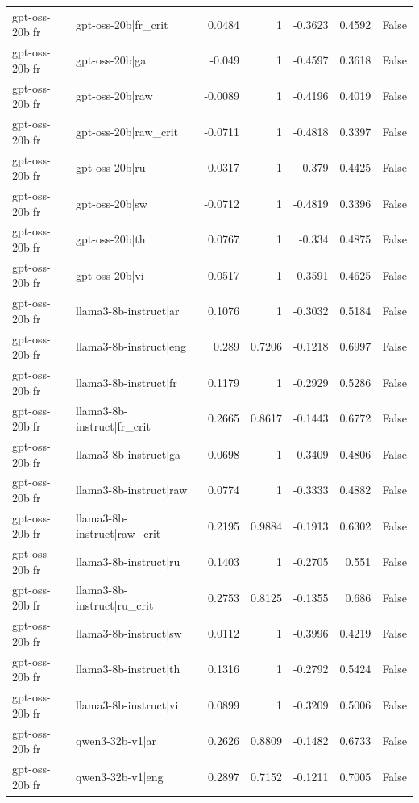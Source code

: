 \begin{table}
\begin{tabular}{l l r r r r l}
gpt-oss-20b|fr & gpt-oss-20b|fr_crit & 0.0484 & 1 & -0.3623 & 0.4592 & False \\
gpt-oss-20b|fr & gpt-oss-20b|ga & -0.049 & 1 & -0.4597 & 0.3618 & False \\
gpt-oss-20b|fr & gpt-oss-20b|raw & -0.0089 & 1 & -0.4196 & 0.4019 & False \\
gpt-oss-20b|fr & gpt-oss-20b|raw_crit & -0.0711 & 1 & -0.4818 & 0.3397 & False \\
gpt-oss-20b|fr & gpt-oss-20b|ru & 0.0317 & 1 & -0.379 & 0.4425 & False \\
gpt-oss-20b|fr & gpt-oss-20b|sw & -0.0712 & 1 & -0.4819 & 0.3396 & False \\
gpt-oss-20b|fr & gpt-oss-20b|th & 0.0767 & 1 & -0.334 & 0.4875 & False \\
gpt-oss-20b|fr & gpt-oss-20b|vi & 0.0517 & 1 & -0.3591 & 0.4625 & False \\
gpt-oss-20b|fr & llama3-8b-instruct|ar & 0.1076 & 1 & -0.3032 & 0.5184 & False \\
gpt-oss-20b|fr & llama3-8b-instruct|eng & 0.289 & 0.7206 & -0.1218 & 0.6997 & False \\
gpt-oss-20b|fr & llama3-8b-instruct|fr & 0.1179 & 1 & -0.2929 & 0.5286 & False \\
gpt-oss-20b|fr & llama3-8b-instruct|fr_crit & 0.2665 & 0.8617 & -0.1443 & 0.6772 & False \\
gpt-oss-20b|fr & llama3-8b-instruct|ga & 0.0698 & 1 & -0.3409 & 0.4806 & False \\
gpt-oss-20b|fr & llama3-8b-instruct|raw & 0.0774 & 1 & -0.3333 & 0.4882 & False \\
gpt-oss-20b|fr & llama3-8b-instruct|raw_crit & 0.2195 & 0.9884 & -0.1913 & 0.6302 & False \\
gpt-oss-20b|fr & llama3-8b-instruct|ru & 0.1403 & 1 & -0.2705 & 0.551 & False \\
gpt-oss-20b|fr & llama3-8b-instruct|ru_crit & 0.2753 & 0.8125 & -0.1355 & 0.686 & False \\
gpt-oss-20b|fr & llama3-8b-instruct|sw & 0.0112 & 1 & -0.3996 & 0.4219 & False \\
gpt-oss-20b|fr & llama3-8b-instruct|th & 0.1316 & 1 & -0.2792 & 0.5424 & False \\
gpt-oss-20b|fr & llama3-8b-instruct|vi & 0.0899 & 1 & -0.3209 & 0.5006 & False \\
gpt-oss-20b|fr & qwen3-32b-v1|ar & 0.2626 & 0.8809 & -0.1482 & 0.6733 & False \\
gpt-oss-20b|fr & qwen3-32b-v1|eng & 0.2897 & 0.7152 & -0.1211 & 0.7005 & False \\

\end{tabular}
\end{table}

